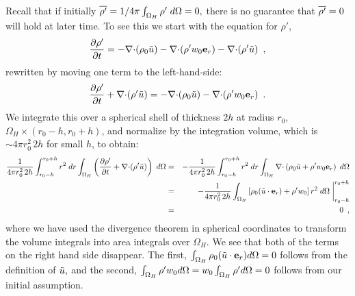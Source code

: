 Recall that if initially $ \overline{{\rho^{\prime}}} = 1 /
{4\pi} \int_{\Omega_H} {\rho^{\prime}} \; d\Omega = 0,$ 
there is no guarantee that $\overline{{\rho^{\prime}}} = 0$ will hold at later
time.  To see this we start with the equation for $\rho'$, 
\begin{equation}
\frac{\partial {\rho^{\prime}}}{\partial t} = - \mathbf{\nabla} \mathbf{\cdot} (\rho_0 \tilde{u})
-\mathbf{\nabla} \mathbf{\cdot} ({\rho^{\prime}} w_0 \mathbf{e}_r) - \mathbf{\nabla} \mathbf{\cdot} ({\rho^{\prime}} \tilde{u} )
\label{eq:rhoprimeold} \enskip ,
\end{equation}
rewritten by moving one term to the left-hand-side:
\begin{equation}
\frac{\partial {\rho^{\prime}}}{\partial t} + \mathbf{\nabla} \mathbf{\cdot} ({\rho^{\prime}} \tilde{u}) 
= - \mathbf{\nabla} \mathbf{\cdot} (\rho_0 \tilde{u})
  -\mathbf{\nabla} \mathbf{\cdot} ({\rho^{\prime}} w_0 \mathbf{e}_r) \enskip .
\end{equation}
We integrate this over a spherical shell of thickness $2h$ at radius $r_0$, 
$\Omega_H \times (r_0-h, r_0+h)$, and normalize by the integration
volume, which is $\sim 4\pi r_0^2 \, 2h$ for small $h$, to obtain:
\begin{eqnarray}
\frac{1}{4\pi r_0^2 \, 2h} \int_{r_0-h}^{r_0+h} r^2 \; dr \int_{\Omega_H} 
    \left(\frac{\partial {\rho^{\prime}}}{\partial t} + \nabla \mathbf{\cdot} ( {\rho^{\prime}} \tilde{u} ) \right) \; d\Omega 
&=& - \frac{1}{4\pi r_0^2 \, 2h} \int_{r_0-h}^{r_0+h} r^2 \; dr 
\int_{\Omega_H} \nabla \mathbf{\cdot} \left( \rho_0 \tilde{u} + {\rho^{\prime}} w_0 \mathbf{e}_r \right) \; d\Omega \nonumber  \\
&=& \left .  - \frac{1}{4\pi r_0^2 \, 2h}  \int_{\Omega_H} 
\left [ \rho_0  (\tilde{u} \cdot \mathbf{e}_r)  + {\rho^{\prime}} w_0 \right] r^2
  \; d\Omega  \; \right  |_{r_0-h}^{r_0+h} \nonumber  \\
&=& 0 \nonumber \enskip ,
\end{eqnarray} 
where we have used the divergence theorem in spherical coordinates to transform
the volume integrals into area integrals over $\Omega_H.$
We see that both of the terms on the right hand side disappear. The first,
$\int_{\Omega_H} \rho_0 (\tilde{u} \cdot \mathbf{e}_r) d\Omega = 0$ follows from the definition of $\tilde{u},$
and the second, $\int_{\Omega_H} {\rho^{\prime}} w_0 d\Omega = w_0 \int_{\Omega_H} {\rho^{\prime}} d\Omega = 0$
follows from our initial assumption.  
